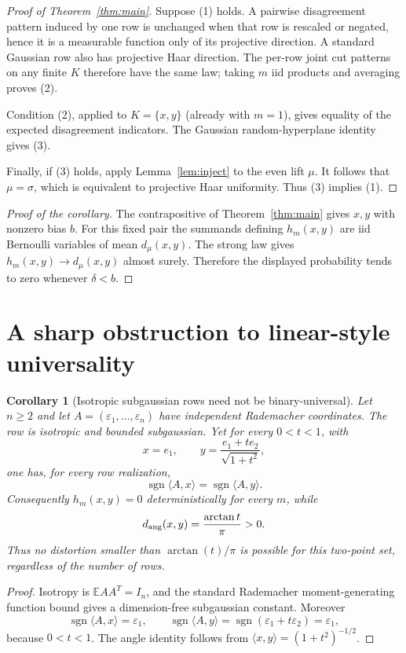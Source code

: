 \documentclass[11pt]{article}
\newtheorem{corollary}[theorem]{Corollary}
\newcommand{\E}{\mathbb E}
\newcommand{\sgn}{\operatorname{sgn}}
\begin{document}
\begin{proof}[Proof of Theorem~\ref{thm:main}]
Suppose (1) holds.  A pairwise disagreement pattern induced by one row is
unchanged when that row is rescaled or negated, hence it is a measurable
function only of its projective direction.  A standard Gaussian row also has
projective Haar direction.  The per-row joint cut patterns on any finite $K$
therefore have the same law; taking $m$ iid products and averaging proves (2).

Condition (2), applied to $K=\{x,y\}$ (already with $m=1$), gives equality of
the expected disagreement indicators.  The Gaussian random-hyperplane
identity gives (3).

Finally, if (3) holds, apply Lemma~\ref{lem:inject} to the even lift $\mu$.
It follows that $\mu=\sigma$, which is equivalent to projective Haar
uniformity.  Thus (3) implies (1).
\end{proof}

\begin{proof}[Proof of the corollary]
The contrapositive of Theorem~\ref{thm:main} gives $x,y$ with nonzero bias
$b$.  For this fixed pair the summands defining $h_m(x,y)$ are iid Bernoulli
variables of mean $d_\mu(x,y)$.  The strong law gives
$h_m(x,y)\to d_\mu(x,y)$ almost surely.  Therefore the displayed probability
tends to zero whenever $\delta<b$.
\end{proof}

\section{A sharp obstruction to linear-style universality}

\begin{corollary}[Isotropic subgaussian rows need not be binary-universal]
\label{cor:rademacher}
Let $n\geq2$ and let $A=(\varepsilon_1,\dots,\varepsilon_n)$ have independent
Rademacher coordinates.  The row is isotropic and bounded subgaussian.  Yet
for every $0<t<1$, with
\[
 x=e_1,
 \qquad
 y=\frac{e_1+t e_2}{\sqrt{1+t^2}},
\]
one has, for every row realization,
\[
 \sgn\langle A,x\rangle=\sgn\langle A,y\rangle.
\]
Consequently $h_m(x,y)=0$ deterministically for every $m$, while
\[
 d_{\rm ang}(x,y)=\frac{\arctan t}{\pi}>0.
\]
Thus no distortion smaller than $\arctan(t)/\pi$ is possible for this
two-point set, regardless of the number of rows.
\end{corollary}

\begin{proof}
Isotropy is $\E AA^T=I_n$, and the standard Rademacher moment-generating
function bound gives a dimension-free subgaussian constant.  Moreover
\[
 \sgn\langle A,x\rangle=\varepsilon_1,
 \qquad
 \sgn\langle A,y\rangle
 =\sgn(\varepsilon_1+t\varepsilon_2)=\varepsilon_1,
\]
because $0<t<1$.  The angle identity follows from
$\langle x,y\rangle=(1+t^2)^{-1/2}$.
\end{proof}
\end{document}
